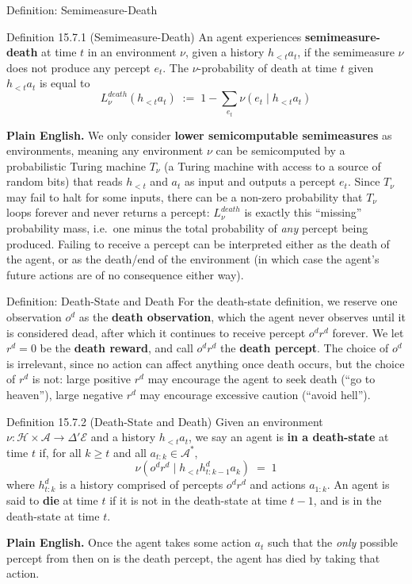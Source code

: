 \documentclass[aspectratio=169,10pt]{beamer}
\newcommand{\Ac}{\mathcal{A}}
\newcommand{\Ec}{\mathcal{E}}
\newcommand{\Hc}{\mathcal{H}}
\newcommand{\hlt}{h_{<t}}
\newcommand{\od}{o^d}
\newcommand{\rd}{r^d}
\begin{document}
\begin{frame}{Definition: Semimeasure-Death}
  \begin{block}{Definition 15.7.1 (Semimeasure-Death)}
    An agent experiences \textbf{semimeasure-death} at time $t$ in an
    environment $\nu$, given a history $\hlt a_t$, if the semimeasure
    $\nu$ does not produce any percept $e_t$. The $\nu$-probability of
    death at time $t$ given $\hlt a_t$ is equal to
    \[
      L^{death}_\nu(\hlt a_t) \;:=\; 1 - \sum_{e_t}\nu(e_t\mid \hlt a_t)
    \]
  \end{block}

  \textbf{Plain English.} We only consider \textbf{lower semicomputable
  semimeasures} as environments, meaning any environment $\nu$ can be
  semicomputed by a probabilistic Turing machine $T_\nu$ (a Turing machine
  with access to a source of random bits) that reads $\hlt$ and $a_t$ as
  input and outputs a percept $e_t$. Since $T_\nu$ may fail to halt for
  some inputs, there can be a non-zero probability that $T_\nu$ loops
  forever and never returns a percept: $L^{death}_\nu$ is exactly this
  ``missing'' probability mass, i.e.\ one minus the total probability of
  \emph{any} percept being produced. Failing to receive a percept can be
  interpreted either as the death of the agent, or as the death/end of the
  environment (in which case the agent's future actions are of no
  consequence either way).
\end{frame}

\begin{frame}{Definition: Death-State and Death}
  For the death-state definition, we reserve one observation $\od$ as the
  \textbf{death observation}, which the agent never observes until it is
  considered dead, after which it continues to receive percept $\od\rd$
  forever. We let $\rd=0$ be the \textbf{death reward}, and call $\od\rd$
  the \textbf{death percept}. The choice of $\od$ is irrelevant, since no
  action can affect anything once death occurs, but the choice of $\rd$
  is not: large positive $\rd$ may encourage the agent to seek death (``go
  to heaven''), large negative $\rd$ may encourage excessive caution
  (``avoid hell'').

  \begin{block}{Definition 15.7.2 (Death-State and Death)}
    Given an environment $\nu:\Hc\times\Ac\to\Delta'\Ec$ and a history
    $\hlt a_t$, we say an agent is \textbf{in a death-state} at time $t$
    if, for all $k\ge t$ and all $a_{t:k}\in\Ac^*$,
    \[
      \nu(\od\rd \mid \hlt h^d_{t:k-1} a_k) \;=\; 1
    \]
    where $h^d_{t:k}$ is a history comprised of percepts $\od\rd$ and
    actions $a_{1:k}$. An agent is said to \textbf{die} at time $t$ if it
    is not in the death-state at time $t-1$, and is in the death-state at
    time $t$.
  \end{block}

  \textbf{Plain English.} Once the agent takes some action $a_t$ such that
  the \emph{only} possible percept from then on is the death percept, the
  agent has died by taking that action.
\end{frame}
\end{document}
